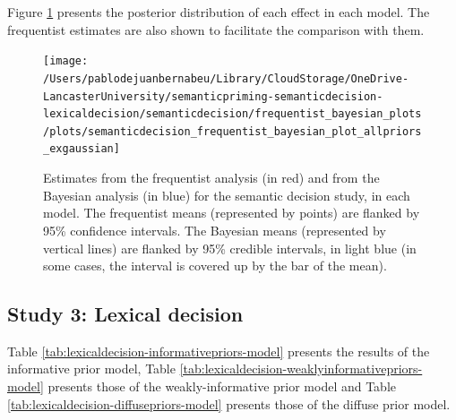 \documentclass[
  12pt,
  man,floatsintext]{apa7}
\begin{document}
Figure \ref{fig:semanticdecision-frequentist-bayesian-plot-allpriors-exgaussian} presents the posterior distribution of each effect in each model. The frequentist estimates are also shown to facilitate the comparison with them.

\begin{figure}

{\centering \texttt{[image: /Users/pablodejuanbernabeu/Library/CloudStorage/OneDrive-LancasterUniversity/semanticpriming-semanticdecision-lexicaldecision/semanticdecision/frequentist\_bayesian\_plots/plots/semanticdecision\_frequentist\_bayesian\_plot\_allpriors\_exgaussian]} 

}

\caption{Estimates from the frequentist analysis (in red) and from the Bayesian analysis (in blue) for the semantic decision study, in each model. The frequentist means (represented by points) are flanked by 95\% confidence intervals. The Bayesian means (represented by vertical lines) are flanked by 95\% credible intervals, in light blue (in some cases, the interval is covered up by the bar of the mean).}\label{fig:semanticdecision-frequentist-bayesian-plot-allpriors-exgaussian}
\end{figure}

\hypertarget{study-3-lexical-decision-5}{%
\subsection{Study 3: Lexical decision}\label{study-3-lexical-decision-5}}

Table \ref{tab:lexicaldecision-informativepriors-model} presents the results of the informative prior model, Table \ref{tab:lexicaldecision-weaklyinformativepriors-model} presents those of the weakly-informative prior model and Table \ref{tab:lexicaldecision-diffusepriors-model} presents those of the diffuse prior model.
\end{document}
